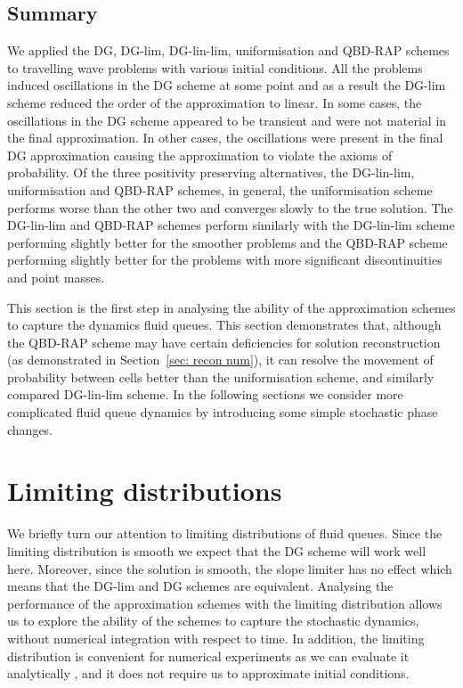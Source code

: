 \subsection*{Summary}
We applied the DG, DG-lim, DG-lin-lim, uniformisation and QBD-RAP schemes to travelling wave problems with various initial conditions. All the problems induced oscillations in the DG scheme at some point and as a result the DG-lim scheme reduced the order of the approximation to linear. In some cases, the oscillations in the DG scheme appeared to be transient and were not material in the final approximation. In other cases, the oscillations were present in the final DG approximation causing the approximation to violate the axioms of probability. Of the three positivity preserving alternatives, the DG-lin-lim, uniformisation and QBD-RAP schemes, in general, the uniformisation scheme performs worse than the other two and converges slowly to the true solution. The DG-lin-lim and QBD-RAP schemes perform similarly with the DG-lin-lim scheme performing slightly better for the smoother problems and the QBD-RAP scheme performing slightly better for the problems with more significant discontinuities and point masses. 

This section is the first step in analysing the ability of the approximation schemes to capture the dynamics fluid queues. This section demonstrates that, although the QBD-RAP scheme may have certain deficiencies for solution reconstruction (as demonstrated in Section~\ref{sec: recon num}), it can resolve the movement of probability between cells better than the uniformisation scheme, and similarly compared DG-lin-lim scheme. In the following sections we consider more complicated fluid queue dynamics by introducing some simple stochastic phase changes. 

\FloatBarrier
\section{Limiting distributions} \label{sec:stat}
We briefly turn our attention to limiting distributions of fluid queues. Since the limiting distribution is smooth we expect that the DG scheme will work well here. Moreover, since the solution is smooth, the slope limiter has no effect which means that the DG-lim and DG schemes are equivalent. Analysing the performance of the approximation schemes with the limiting distribution allows us to explore the ability of the schemes to capture the stochastic dynamics, without numerical integration with respect to time. In addition, the limiting distribution is convenient for numerical experiments as we can evaluate it analytically \citep{s2017}, and it does not require us to approximate initial conditions.

